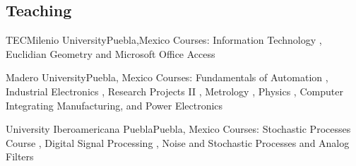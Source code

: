 \documentclass[10pt,a4paper,roman]{moderncv}
\begin{document}
\subsection{Teaching}

{TECMilenio University}{Puebla,Mexico}{}
{Courses: 
Information Technology \href{https://sites.google.com/site/perezxochicale/teaching/iit}{\faGlobe},
Euclidian Geometry  \href{https://sites.google.com/site/perezxochicale/teaching/euclidean-geometry}{\faGlobe}
and
Microsoft Office Access \href{https://sites.google.com/site/perezxochicale/teaching/moa}{\faGlobe}
}

{Madero University}{Puebla, Mexico}{}
{Courses: Fundamentals of Automation 
\href{https://sites.google.com/site/perezxochicale/digital-electronics}{\faGlobe}, 
Industrial Electronics \href{https://sites.google.com/site/perezxochicale/ie}{\faGlobe}, 
Research Projects II \href{https://sites.google.com/site/perezxochicale/latex/thesistemplate}{\faGlobe}, 
Metrology \href{https://sites.google.com/site/perezxochicale/metrology}{\faGlobe}, 
Physics \href{http://goo.gl/fffnG}{\faGlobe}, 
Computer Integrating Manufacturing, and Power Electronics
}


{University Iberoamericana Puebla}{Puebla, Mexico}{}
{Courses: Stochastic Processes Course 
\href{https://sites.google.com/site/perezxochicale/stochastic-processes-course}{\faGlobe}, 
Digital Signal Processing 
\href{https://sites.google.com/site/perezxochicale/digital-signal-processing-course}{\faGlobe}, 
Noise and Stochastic Processes and Analog Filters 
}
\end{document}
